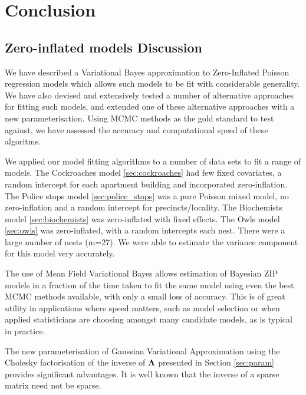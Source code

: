 \chapter{Conclusion}

\section{Zero-inflated models Discussion}
\label{sec:discussion}
		
We have described a Variational Bayes approximation to Zero-Inflated Poisson regression models which
allows such models to be fit with considerable generality. We have also devised and extensively tested a
number of alternative approaches for fitting such models, and extended one of these alternative
approaches with a new parameterisation. Using MCMC methods as the gold standard to test against, we have
assessed the accuracy and computational speed of these algoritms.
		
We applied our model fitting algorithms to a number of data sets to fit a range of models. The Cockroaches
model \ref{sec:cockroaches} had few fixed covariates, a random intercept for each apartment building and
incorporated zero-inflation. The Police stops model \ref{sec:police_stops} was a pure Poisson mixed model, no
zero-inflation and a random intercept for precincts/locality. The Biochemists model \ref{sec:biochemists} was
zero-inflated with fixed effects. The Owls model \ref{sec:owls} was zero-inflated,  with a random intercepts
each nest. There were a large number of nests (m=27). We were able to estimate the variance component for this
model very accurately.

The use of Mean Field Variational Bayes allows estimation of Bayesian ZIP models in a fraction of the
time taken to fit the same model using even the best MCMC methods available, with only a small loss of
accuracy. This is of great utility in applications where speed matters, such as model selection or when
applied statisticians are choosing amongst many candidate models, as is typical in practice.
		
The new parameterisation of Gaussian Variational Approximation using the Cholesky factorisation of the
inverse of ${\boldsymbol \Lambda}$ presented in Section \ref{sec:param} provides significant advantages.  It is well
known that the inverse of a sparse matrix need not be sparse.

